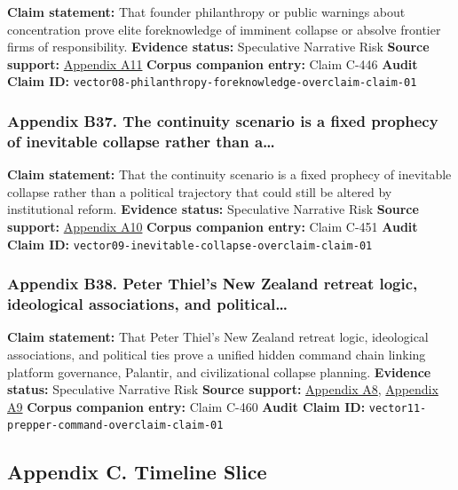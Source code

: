 \documentclass[
  american,
  11pt,
  letterpaper,
]{article}
\begin{document}
\textbf{Claim statement:} That founder philanthropy or public warnings
about concentration prove elite foreknowledge of imminent collapse or
absolve frontier firms of responsibility. \textbf{Evidence status:}
Speculative Narrative Risk \textbf{Source support:}
\hyperref[appendix-a11-the-adolescence-of-technology]{Appendix A11}
\textbf{Corpus companion entry:} Claim C-446 \textbf{Audit Claim ID:}
\texttt{vector08-philanthropy-foreknowledge-overclaim-claim-01}

\subsubsection{Appendix B37. The continuity scenario is a fixed prophecy
of inevitable collapse rather than
a\ldots{}}\label{appendix-b37-the-continuity-scenario-is-a-fixed-prophecy-of-inevitable-collapse-rather-than-a}

\textbf{Claim statement:} That the continuity scenario is a fixed
prophecy of inevitable collapse rather than a political trajectory that
could still be altered by institutional reform. \textbf{Evidence
status:} Speculative Narrative Risk \textbf{Source support:}
\hyperref[appendix-a10-annual-economic-report-2026]{Appendix A10}
\textbf{Corpus companion entry:} Claim C-451 \textbf{Audit Claim ID:}
\texttt{vector09-inevitable-collapse-overclaim-claim-01}

\subsubsection{Appendix B38. Peter Thiel's New Zealand retreat logic,
ideological associations, and
political\ldots{}}\label{appendix-b38-peter-thiel-s-new-zealand-retreat-logic-ideological-associations-and-political}

\textbf{Claim statement:} That Peter Thiel's New Zealand retreat logic,
ideological associations, and political ties prove a unified hidden
command chain linking platform governance, Palantir, and civilizational
collapse planning. \textbf{Evidence status:} Speculative Narrative Risk
\textbf{Source support:}
\hyperref[appendix-a8-why-silicon-valley-billionaires-are-prepping-for-the-apocalypse-in-new-zealand]{Appendix
A8},
\hyperref[appendix-a9-new-zealand-woos-the-wealthy-with-golden-visa-changes]{Appendix
A9} \textbf{Corpus companion entry:} Claim C-460 \textbf{Audit Claim
ID:} \texttt{vector11-prepper-command-overclaim-claim-01}

\subsection{Appendix C. Timeline
Slice}\label{appendix-c.-timeline-slice}
\end{document}
